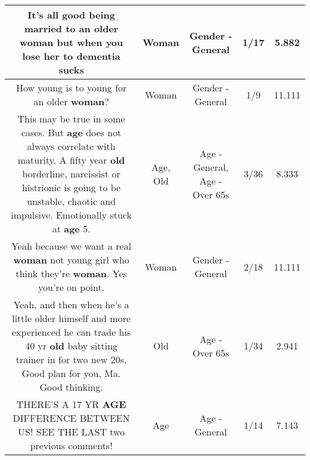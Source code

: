 \documentclass[11pt]{article}
\newlength\mylength
\begin{document}
\begin{center}
\begin{longtable}{|C{.65\mylength}|C{.30\mylength}|C{.12\mylength}|C{.12\mylength}|C{.12\mylength}|}
  \small It's all good being married to an older \textbf{woman} but when you lose her to dementia sucks\normalsize   & Woman & Gender - General & 1/17 & 5.882 \\  \hline
  \small How young is to young for an older \textbf{woman}?\normalsize   & Woman & Gender - General & 1/9 & 11.111 \\  \hline
  \small This may be true in some cases.  But \textbf{age} does not always correlate with maturity.  A fifty year \textbf{old} borderline, narcissist or histrionic is going to be unstable, chaotic and impulsive.  Emotionally stuck at \textbf{age} 5.\normalsize   & Age, Old & Age - General, Age - Over 65s & 3/36 & 8.333 \\  \hline
  \small Yeah because we want a real \textbf{woman} not young girl who think they're \textbf{woman}. Yes you're on point.\normalsize   & Woman & Gender - General & 2/18 & 11.111 \\  \hline
  \small Yeah, and then when he's a little older himself and more experienced he can trade his 40 yr \textbf{old} baby sitting trainer in for two new 20s, Good plan for you, Ma. Good thinking.\normalsize   & Old & Age - Over 65s & 1/34 & 2.941 \\  \hline
  \small THERE'S A 17 YR \textbf{AGE} DIFFERENCE BETWEEN US! SEE THE LAST two previous comments!\normalsize   & Age & Age - General & 1/14 & 7.143 \\  \hline

\end{longtable}
\end{center}
\end{document}
